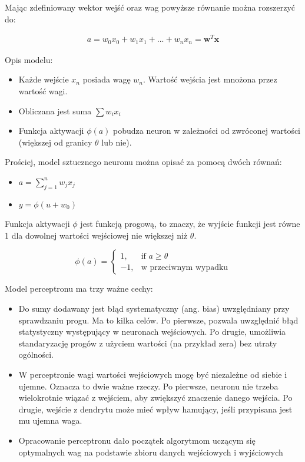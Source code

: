 Mając zdefiniowany wektor wejść oraz wag powyższe równanie można rozszerzyć do:

\begin{gather*} 
a = w_{0}x_{0} + w_{1}x_{1} + ... + w_{n}x_{n} = \textbf{w}^{T}\textbf{x}
\end{gather*}



Opis modelu:
\begin{itemize}
	\item Każde wejście $x_{n}$ posiada wagę $w_{n}$. Wartość wejścia jest mnożona przez wartość wagi.
	\item Obliczana jest suma $\sum w_{i}x_{i}$
	\item Funkcja aktywacji $\phi(a)$ pobudza neuron w zależności od zwróconej wartości (większej od granicy $\theta$ lub nie).
\end{itemize}

Prościej, model sztucznego neuronu można opisać za pomocą dwóch równań:
\begin{itemize}
	\item $a  = \sum_{j=1}^{n} w_{j}x_{j}$
	\item $y  = \phi (u + w_{0}) $
\end{itemize}

Funkcja aktywacji $\phi$ jest funkcją progową, to znaczy, że wyjście funkcji jest równe 1 dla dowolnej wartości wejściowej nie większej niż $\theta$.


\[
\phi(a)= 
\begin{cases}
1, & \text{if }  a \geq \theta \\
-1,              & \text{w przeciwnym wypadku}
\end{cases}
\]

Model perceptronu ma trzy ważne cechy:
\begin{itemize}

\item	Do sumy dodawany jest błąd systematyczny (ang. bias) uwzględniany przy sprawdzaniu progu. Ma to kilka celów. Po pierwsze, pozwala uwzględnić błąd statystyczny występujący w neuronach wejściowych. Po drugie, umożliwia standaryzację progów z użyciem wartości (na przykład zera) bez utraty ogólności.

\item	W perceptronie wagi wartości wejściowych mogę być niezależne od siebie i ujemne. Oznacza to dwie ważne rzeczy. Po pierwsze, neuronu nie trzeba wielokrotnie wiązać z wejściem, aby zwiększyć znaczenie danego wejścia. Po drugie, wejście z dendrytu może mieć wpływ hamujący, jeśli przypisana jest mu ujemna waga.

\item	Opracowanie perceptronu dało początek algorytmom uczącym się optymalnych wag na podstawie zbioru danych wejściowych i wyjściowych
\end{itemize}


